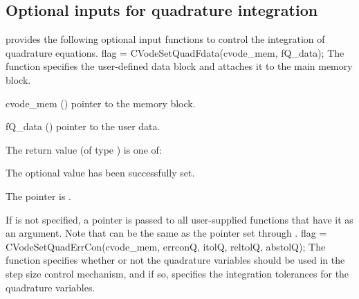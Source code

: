 \subsection{Optional inputs for quadrature integration}\label{ss:quad_optional_input}
{\cvodes} provides the following optional input functions to control the integration
of quadrature equations.
{
  flag = CVodeSetQuadFdata(cvode\_mem, fQ\_data);
}
{
  The function  specifies the user-defined data block 
  and attaches it to the main {\cvodes} memory block.
}
{
  \begin{args}
  \item[cvode\_mem] ()
    pointer to the {\cvodes} memory block.
  \item[fQ\_data] ()
    pointer to the user data.
  \end{args}
}
{
  The return value  (of type ) is one of:
  \begin{args}
  \item[\Id{CV\_SUCCESS}] 
    The optional value has been successfully set.
  \item[\Id{CV\_MEM\_NULL}]
    The  pointer is .
  \end{args}
}
{
  If  is not specified, a  pointer is
  passed to all user-supplied functions that have it as an argument.
  Note that  can be the same as the
  pointer  set through .
}
{
 flag = CVodeSetQuadErrCon(cvode\_mem, errconQ, itolQ, reltolQ, abstolQ);
}
{
  The function  specifies whether or not the
  quadrature variables should be used in the step size control
  mechanism, and if so, specifies the integration tolerances for the
  quadrature variables.  
}

